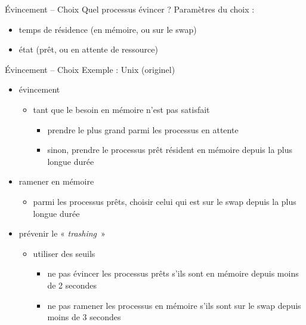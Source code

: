 \begin {frame} {Évincement -- Choix}
    Quel processus évincer ? Paramètres du choix :
    \begin {itemize}
	\item temps de résidence (en mémoire, ou sur le swap)
	\item état (prêt, ou en attente de ressource)
    \end {itemize}
\end {frame}

\begin {frame} {Évincement -- Choix}
    Exemple : Unix (originel)
    \begin {itemize}
	\item évincement
	    \begin {itemize}
		\item tant que le besoin en mémoire n'est pas satisfait
		    \begin {itemize}
			\item prendre le plus grand parmi les processus
			    en attente
			\item sinon, prendre le processus prêt
			    résident en mémoire depuis la plus longue
			    durée
		    \end {itemize}
	    \end {itemize}
	\item ramener en mémoire
	    \begin {itemize}
		\item parmi les processus prêts, choisir celui qui est
		    sur le swap depuis la plus longue durée
	    \end {itemize}
	\item prévenir le « \textit {trashing}~»
	    \begin {itemize}
		\item utiliser des seuils
		    \begin {itemize}
			\item ne pas évincer les processus prêts s'ils
			    sont en mémoire depuis moins de 2 secondes
			\item ne pas ramener les processus en mémoire
			    s'ils sont sur le swap depuis moins de
			    3 secondes
		    \end {itemize}
	    \end {itemize}
    \end {itemize}
\end {frame}


